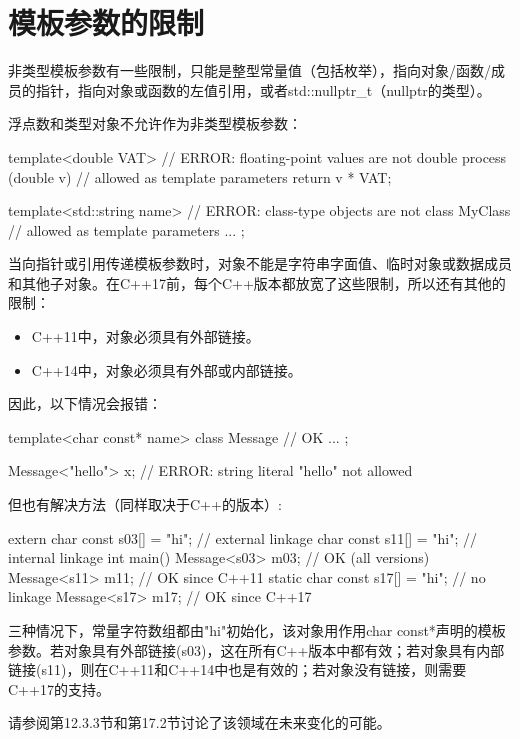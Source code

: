 \section{模板参数的限制}
非类型模板参数有一些限制，只能是整型常量值（包括枚举），指向对象/函数/成员的指针，指向对象或函数的左值引用，或者std::nullptr\_t（nullptr的类型）。

浮点数和类型对象不允许作为非类型模板参数：

\begin{cpp}
template<double VAT> // ERROR: floating-point values are not
double process (double v) { // allowed as template parameters
	return v * VAT;
}

template<std::string name> // ERROR: class-type objects are not
class MyClass { // allowed as template parameters
	...
};
\end{cpp}

当向指针或引用传递模板参数时，对象不能是字符串字面值、临时对象或数据成员和其他子对象。在C++17前，每个C++版本都放宽了这些限制，所以还有其他的限制：

\begin{itemize}
\item 
C++11中，对象必须具有外部链接。

\item 
C++14中，对象必须具有外部或内部链接。
\end{itemize}

因此，以下情况会报错：

\begin{cpp}
template<char const* name>
class Message { // OK
	...
};

Message<"hello"> x; // ERROR: string literal "hello" not allowed
\end{cpp}

但也有解决方法（同样取决于C++的版本）:

\begin{cpp}
extern char const s03[] = "hi"; // external linkage
char const s11[] = "hi"; // internal linkage
int main() {
	Message<s03> m03; // OK (all versions)
	Message<s11> m11; // OK since C++11
	static char const s17[] = "hi"; // no linkage
	Message<s17> m17; // OK since C++17
}
\end{cpp}

三种情况下，常量字符数组都由"hi"初始化，该对象用作用char const*声明的模板参数。若对象具有外部链接(s03)，这在所有C++版本中都有效；若对象具有内部链接(s11)，则在C++11和C++14中也是有效的；若对象没有链接，则需要C++17的支持。

请参阅第12.3.3节和第17.2节讨论了该领域在未来变化的可能。


